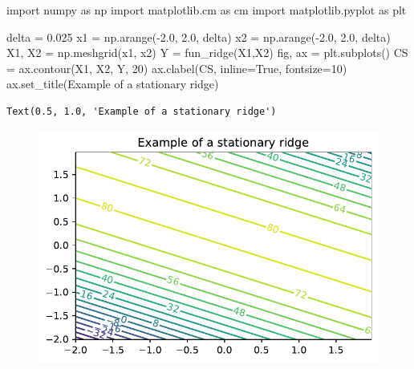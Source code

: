 \documentclass[
  letterpaper,
  DIV=11,
  numbers=noendperiod]{scrreprt}
\newenvironment{Shaded}{\begin{snugshade}}{\end{snugshade}}
\newcommand{\DecValTok}[1]{\textcolor[rgb]{0.68,0.00,0.00}{#1}}
\newcommand{\FloatTok}[1]{\textcolor[rgb]{0.68,0.00,0.00}{#1}}
\newcommand{\ImportTok}[1]{\textcolor[rgb]{0.00,0.46,0.62}{#1}}
\newcommand{\NormalTok}[1]{\textcolor[rgb]{0.00,0.23,0.31}{#1}}
\newcommand{\OperatorTok}[1]{\textcolor[rgb]{0.37,0.37,0.37}{#1}}
\newcommand{\StringTok}[1]{\textcolor[rgb]{0.13,0.47,0.30}{#1}}
\newcommand{\VariableTok}[1]{\textcolor[rgb]{0.07,0.07,0.07}{#1}}
\begin{document}
\begin{Shaded}
\begin{Highlighting}[]
\ImportTok{import}\NormalTok{ numpy }\ImportTok{as}\NormalTok{ np}
\ImportTok{import}\NormalTok{ matplotlib.cm }\ImportTok{as}\NormalTok{ cm}
\ImportTok{import}\NormalTok{ matplotlib.pyplot }\ImportTok{as}\NormalTok{ plt}

\NormalTok{delta }\OperatorTok{=} \FloatTok{0.025}
\NormalTok{x1 }\OperatorTok{=}\NormalTok{ np.arange(}\OperatorTok{{-}}\FloatTok{2.0}\NormalTok{, }\FloatTok{2.0}\NormalTok{, delta)}
\NormalTok{x2 }\OperatorTok{=}\NormalTok{ np.arange(}\OperatorTok{{-}}\FloatTok{2.0}\NormalTok{, }\FloatTok{2.0}\NormalTok{, delta)}
\NormalTok{X1, X2 }\OperatorTok{=}\NormalTok{ np.meshgrid(x1, x2)}
\NormalTok{Y }\OperatorTok{=}\NormalTok{ fun\_ridge(X1,X2)}
\NormalTok{fig, ax }\OperatorTok{=}\NormalTok{ plt.subplots()}
\NormalTok{CS }\OperatorTok{=}\NormalTok{ ax.contour(X1, X2, Y, }\DecValTok{20}\NormalTok{)}
\NormalTok{ax.clabel(CS, inline}\OperatorTok{=}\VariableTok{True}\NormalTok{, fontsize}\OperatorTok{=}\DecValTok{10}\NormalTok{)}
\NormalTok{ax.set\_title(}\StringTok{\textquotesingle{}Example of a stationary ridge\textquotesingle{}}\NormalTok{)}
\end{Highlighting}
\end{Shaded}

\begin{verbatim}
Text(0.5, 1.0, 'Example of a stationary ridge')
\end{verbatim}

\begin{figure}[H]

{\centering \includegraphics{005_num_rsm_files/figure-pdf/cell-11-output-2.pdf}

}

\end{figure}
\end{document}
